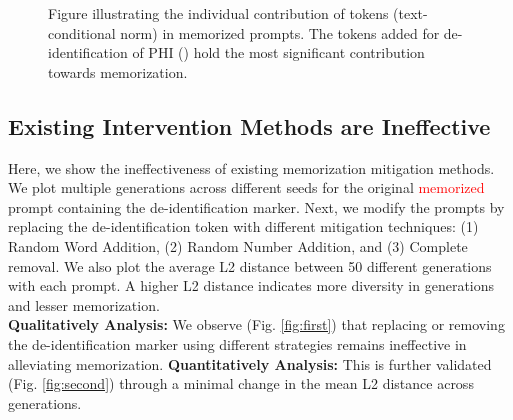 \begin{figure}[htbp]
    \centering
    
    
    
    
    \caption{Figure illustrating the individual contribution of tokens (text-conditional norm) in memorized prompts. The tokens added for de-identification of PHI (\quotes{\textcolor{red}{\textunderscore\textunderscore\textunderscore}}) hold the most significant contribution towards memorization.}
    \label{fig:three_plots}
\end{figure}


\subsection{Existing Intervention Methods are Ineffective}

Here, we show the ineffectiveness of existing memorization mitigation methods. We plot multiple generations across different seeds for the original \textcolor{red}{memorized} prompt containing the de-identification marker. Next, we modify the prompts by replacing the de-identification token with different mitigation techniques: (1) Random Word Addition, (2) Random Number Addition, and (3) Complete removal. We also plot the average L2 distance between 50 different generations with each prompt. A higher L2 distance indicates more diversity in generations and lesser memorization. \\
\textbf{Qualitatively Analysis:} We observe (Fig. \ref{fig:first}) that replacing or removing the de-identification marker using different strategies remains ineffective in alleviating memorization. \textbf{Quantitatively Analysis: }This is further validated (Fig. \ref{fig:second}) through a minimal change in the mean L2 distance across generations.

